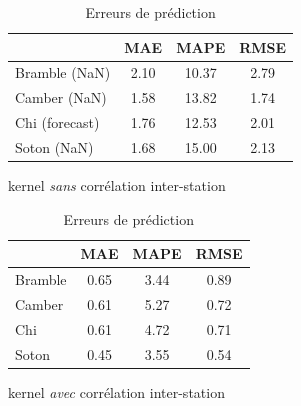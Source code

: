 \documentclass[xcolor=svgnames, t]{beamer}
\newcommand{\coloredemph}[1]{\textcolor{internationalblue}{\emph{#1}}}
\begin{document}
\begin{frame}{\subsecname}
  \begin{table}[h]
    \centering
    \begin{subtable}%
      \centering
      \begin{tabular}{|l|c|c|c|}
        \hline
        & MAE & MAPE & RMSE \\
        \hline
        Bramble (NaN) & 2.10 & 10.37 & 2.79 \\
        Camber (NaN) & 1.58 & 13.82 & 1.74 \\
        Chi (forecast) & 1.76 & 12.53 & 2.01 \\
        Soton (NaN) & 1.68 & 15.00 & 2.13 \\
        \hline
      \end{tabular}
      \caption*{kernel \coloredemph{sans} corrélation inter-station}
    \end{subtable}%
    \begin{subtable}%
      \centering
      \begin{tabular}{|l|c|c|c|}
        \hline
        & MAE & MAPE & RMSE \\
        \hline
        Bramble & 0.65 & 3.44 & 0.89 \\
        Camber & 0.61 & 5.27 & 0.72 \\
        Chi & 0.61 & 4.72 & 0.71 \\
        Soton & 0.45 & 3.55 & 0.54 \\
        \hline
      \end{tabular}
      \caption*{kernel \coloredemph{avec} corrélation inter-station}
    \end{subtable}
    \caption{Erreurs de prédiction}
  \end{table}
\end{frame}
\end{document}
